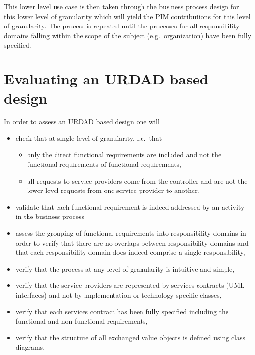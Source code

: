\documentclass{IOS-Book-Article}
\begin{document}
This lower level use case is then taken through the business process design for this
lower level of granularity which will yield the PIM contributions for this level of granularity.
The process is repeated until the processes for all responsibility domains falling within
the scope of the subject (e.g.\ organization) have been fully specified.


\section{Evaluating an URDAD based design}

In order to assess an URDAD based design one will
\begin{itemize}
   \item check that at single level of granularity, i.e.\ that
   \begin{itemize}
		\item only the direct functional requirements are included and not the functional requirements
				of functional requirements,
		\item all requests to service providers come from the controller and are not the lower level
				requests from one service provider to another.
   \end{itemize}
   \item validate that each functional requirement is indeed addressed by an activity in the business process,
   \item assess the grouping of functional requirements into responsibility domains in
             order to verify that there are no overlaps between responsibility domains and that
             each responsibility domain does indeed comprise a single responsibility,
    \item verify that the process at any level of granularity is intuitive and simple,
    \item verify that the service providers are represented by services contracts (UML interfaces) and 
              not by implementation or technology specific classes,
    \item verify that each services contract has been fully specified including the functional and
              non-functional requirements,
    \item verify that the structure of all exchanged value objects is defined using class diagrams.
\end{itemize}
\end{document}
